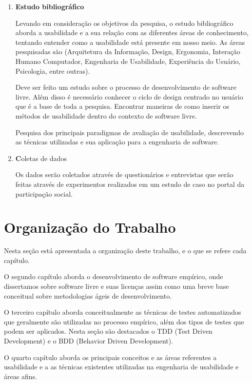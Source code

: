 	\begin{enumerate}
	\item \textbf{Estudo bibliográfico}

	Levando em consideração os objetivos da pesquisa, o estudo bibliográfico aborda a usabilidade e a sua relação com as diferentes áreas de conhecimento, tentando entender como a usabilidade está presente em nosso meio. As áreas pesquisadas são (Arquitetura da Informação, Design, Ergonomia, Interação Humano Computador, Engenharia de Usabilidade, Experiência do Usuário, Psicologia, entre outras).

Deve ser feito um estudo sobre o processo  de desenvolvimento de software livre. Além disso é necessário conhecer o ciclo de design centrado no usuário que é a base de toda a pesquisa. Encontrar maneiras de como inserir os métodos de usabilidade dentro do contexto de software livre. 

	Pesquisa dos principais paradigmas de avaliação de usabilidade, descrevendo as técnicas utilizadas e sua aplicação para a engenharia de software.

	\item \textbf Coletas de dados

	Os dados serão coletados através de questionários e entrevistas que serão feitas através de experimentos realizados em um estudo de caso no portal da participação social.

	\end{enumerate}

	\section{Organização do Trabalho}

	Nesta seção está apresentada a organização deste trabalho, e o que se refere cada capítulo.
	
	O segundo capítulo aborda o desenvolvimento de software empírico, onde dissertamos sobre software livre e suas licenças assim como uma breve base conceitual sobre metodologias ágeis de desenvolvimento.
	
	O terceiro capítulo aborda conceitualmente as técnicas de testes automatizados que geralmente são utilizadas no processo empírico, além dos tipos de testes que podem ser aplicados. Nesta seção são destacados o TDD (Test Driven Development) e o BDD (Behavior Driven Development).

	O quarto capítulo aborda os principais conceitos e as áreas referentes a usabilidade e a as técnicas existentes utilizadas na engenharia de usabilidade e áreas afins.

